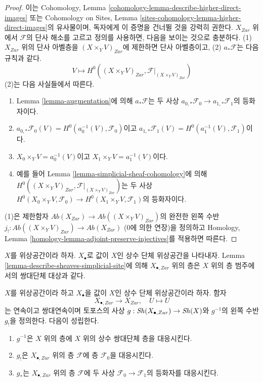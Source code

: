 \begin{proof}
이는 Cohomology, Lemma
\ref{cohomology-lemma-describe-higher-direct-images} 또는
Cohomology on Sites, Lemma
\ref{sites-cohomology-lemma-higher-direct-images}의 유사물이며,
독자에게 이 증명을 건너뛸 것을 강력히 권한다.
$X_{Zar}$ 위에서 $\mathcal{F}$의 단사 해소를 고르고 정의를 사용하면,
다음을 보이는 것으로 충분하다. (1) $X_{Zar}$ 위의 단사 아벨층을
$(X \times_Y V)_{Zar}$에 제한하면 단사 아벨층이고,
(2) $a_*\mathcal{F}$는 다음 규칙과 같다.
$$
V \longmapsto H^0((X \times_Y V)_{Zar}, \mathcal{F}|_{(X \times_Y V)_{Zar}})
$$
(2)는 다음 사실들에서 따른다.
\begin{enumerate}
\item[(2a)] Lemma \ref{lemma-augmentation}에 의해
$a_*\mathcal{F}$는 두 사상
$a_{0, *}\mathcal{F}_0 \to a_{1, *}\mathcal{F}_1$의 등화자이다.
\item[(2b)] $a_{0, *}\mathcal{F}_0(V) =
H^0(a_0^{-1}(V), \mathcal{F}_0)$이고
$a_{1, *}\mathcal{F}_1(V) = H^0(a_1^{-1}(V), \mathcal{F}_1)$이다.
\item[(2c)] $X_0 \times_Y V = a_0^{-1}(V)$이고
$X_1 \times_Y V = a_1^{-1}(V)$이다.
\item[(2d)] 예를 들어 Lemma
\ref{lemma-simplicial-sheaf-cohomology}에 의해
$H^0((X \times_Y V)_{Zar}, \mathcal{F}|_{(X \times_Y V)_{Zar}})$는
두 사상
$H^0(X_0 \times_Y V, \mathcal{F}_0) \to H^0(X_1 \times_Y V, \mathcal{F}_1)$의
등화자이다.
\end{enumerate}
(1)은 제한함자
$\textit{Ab}(X_{Zar}) \to \textit{Ab}((X \times_Y V)_{Zar})$의
완전한 왼쪽 수반
$j_! : \textit{Ab}((X \times_Y V)_{Zar}) \to \textit{Ab}(X_{Zar})$
(0에 의한 연장)을 정의하고 Homology, Lemma
\ref{homology-lemma-adjoint-preserve-injectives}를 적용하면 따른다.
\end{proof}

\noindent
$X$를 위상공간이라 하자. $X_\bullet$로 값이 $X$인 상수 단체
위상공간을 나타내자. Lemma
\ref{lemma-describe-sheaves-simplicial-site}에 의해
$X_{\bullet, Zar}$ 위의 층은 $X$ 위의 층 범주에서의
쌍대단체 대상과 같다.

\begin{lemma}
\label{lemma-constant-simplicial-space}
$X$를 위상공간이라 하고 $X_\bullet$을 값이 $X$인 상수 단체
위상공간이라 하자. 함자
$$
X_{\bullet, Zar} \longrightarrow X_{Zar},\quad
U \longmapsto U
$$
는 연속이고 쌍대연속이며 토포스의 사상
$g : \mathop{\mathit{Sh}}\nolimits(X_{\bullet, Zar}) \to \mathop{\mathit{Sh}}\nolimits(X)$와 $g^{-1}$의 왼쪽 수반
$g_!$을 정의한다. 다음이 성립한다.
\begin{enumerate}
\item $g^{-1}$은 $X$ 위의 층에 $X$ 위의 상수 쌍대단체 층을 대응시킨다.
\item $g_!$은 $X_{\bullet, Zar}$ 위의 층 $\mathcal{F}$에
층 $\mathcal{F}_0$을 대응시킨다.
\item $g_*$는 $X_{\bullet, Zar}$ 위의 층 $\mathcal{F}$에
두 사상 $\mathcal{F}_0 \to \mathcal{F}_1$의 등화자를 대응시킨다.
\end{enumerate}
\end{lemma}

